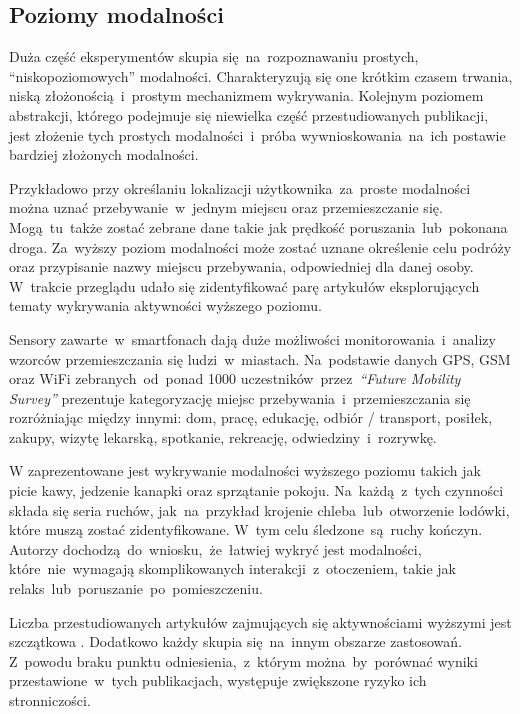 \subsection{Poziomy modalności}
\label{sec:modality_levels}
Duża część eksperymentów skupia się~na~rozpoznawaniu prostych, ``niskopoziomowych'' modalności. Charakteryzują się one krótkim czasem trwania, niską złożonością~i~prostym mechanizmem wykrywania. Kolejnym poziomem abstrakcji, którego podejmuje się niewielka część przestudiowanych publikacji, jest złożenie tych prostych modalności~i~próba wywnioskowania~na~ich postawie bardziej złożonych modalności.

Przykładowo przy określaniu lokalizacji użytkownika~za~proste modalności można uznać przebywanie~w~jednym miejscu oraz przemieszczanie się. Mogą~tu~także zostać zebrane dane takie jak prędkość poruszania~lub~pokonana droga. Za~wyższy poziom modalności może zostać uznane określenie celu podróży oraz przypisanie nazwy miejscu przebywania, odpowiedniej dla danej osoby. W~trakcie przeglądu udało się zidentyfikować parę artykułów eksplorujących tematy wykrywania aktywności wyższego poziomu.
\pagebreak

Sensory zawarte~w~smartfonach dają duże możliwości monitorowania~i~analizy wzorców przemieszczania się ludzi~w~miastach. Na~podstawie danych GPS, GSM oraz WiFi zebranych~od~ponad 1000 uczestników~przez~\textit{``Future Mobility Survey''} \cite{S26} prezentuje kategoryzację miejsc przebywania~i~przemieszczania się rozróżniając między innymi: dom, pracę, edukację, odbiór / transport, posiłek, zakupy, wizytę lekarską, spotkanie, rekreację, odwiedziny~i~rozrywkę.

W \cite{S38} zaprezentowane jest wykrywanie modalności wyższego poziomu takich jak picie kawy, jedzenie kanapki oraz sprzątanie pokoju. Na~każdą~z~tych czynności składa się seria ruchów, jak~na~przykład krojenie chleba~lub~otworzenie lodówki, które muszą zostać zidentyfikowane. W~tym celu śledzone~są~ruchy kończyn. Autorzy dochodzą~do~wniosku,~że~łatwiej wykryć jest modalności, które~nie~wymagają skomplikowanych interakcji~z~otoczeniem, takie jak relaks~lub~poruszanie~po~pomieszczeniu.

Liczba przestudiowanych artykułów zajmujących się aktywnościami wyższymi jest szczątkowa \cite{S26,S62,S38,S36}. Dodatkowo każdy skupia się~na~innym obszarze zastosowań. Z~powodu braku punktu odniesienia,~z~którym można~by~porównać wyniki przestawione~w~tych publikacjach, występuje zwiększone ryzyko ich stronniczości. 


